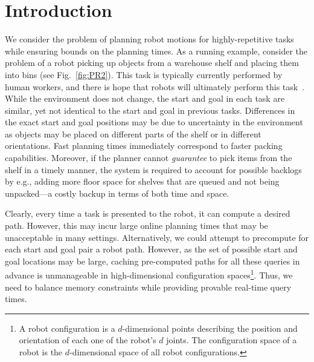 \documentclass[letterpaper]{article} %
\newcommand{\update}[1]{{\color{magenta}#1}}  %
\begin{document}
\section{Introduction}
We consider the problem of planning robot motions for highly-repetitive tasks while ensuring bounds on the planning times.
As a running example, consider the problem of a robot picking up objects from a warehouse shelf and placing them into bins (see Fig.~\ref{fig:PR2}). This task is typically currently performed by human workers, and there is hope that robots will ultimately perform this task~\cite{correll2018analysis}.
While the environment does not change, the start and goal in each task are similar, yet not identical to the start and goal in previous tasks.
Differences in the exact start and goal positions may be due to uncertainty in the environment as objects may be placed on different parts of the shelf or in different orientations.
Fast planning times immediately correspond to faster packing capabilities. 
Moreover, if the planner cannot \emph{guarantee} to pick items from the shelf in a timely manner, the system is required to account for possible backlogs by e.g., adding more floor space for shelves that are queued and not being unpacked---a costly backup in terms of both time and space.


Clearly, every time a task is presented to the robot, it can compute a desired path.
However, this may incur large online planning times that may be unacceptable in many settings.
%
Alternatively, we could attempt to precompute for each start and goal pair a robot path.
However, as the set of possible start and goal locations may be large, caching pre-computed paths for all these queries in advance is unmanageable in high-dimensional configuration spaces\footnote{
A robot configuration is a $d$-dimensional points describing the position and orientation of each one of the robot's $d$ joints.
The configuration space of a robot is the $d$-dimensional space of all robot configurations.}.
Thus, we need to balance memory constraints while providing provable real-time query times.
\end{document}

